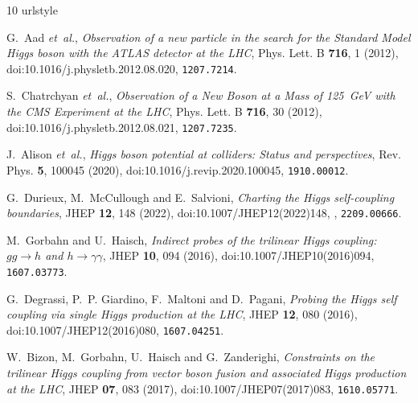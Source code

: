\documentclass{SciPost}
\begin{document}
%
%

\begin{thebibliography}{10}
\providecommand{\url}[1]{\texttt{#1}}
\providecommand{\urlprefix}{URL }
\expandafter\ifx\csname urlstyle\endcsname\relax
  \providecommand{\doi}[1]{doi:\discretionary{}{}{}#1}\else
  \providecommand{\doi}{doi:\discretionary{}{}{}\begingroup \urlstyle{rm}\Url}\fi
\providecommand{\eprint}[2][]{\url{#2}}

G.~Aad \emph{et~al.},
\newblock \emph{{Observation of a new particle in the search for the Standard Model Higgs boson with the ATLAS detector at the LHC}},
\newblock Phys. Lett. B \textbf{716}, 1 (2012),
\newblock \doi{10.1016/j.physletb.2012.08.020},
\newblock \eprint{1207.7214}.

S.~Chatrchyan \emph{et~al.},
\newblock \emph{{Observation of a New Boson at a Mass of 125~GeV with the CMS Experiment at the LHC}},
\newblock Phys. Lett. B \textbf{716}, 30 (2012),
\newblock \doi{10.1016/j.physletb.2012.08.021},
\newblock \eprint{1207.7235}.

J.~Alison \emph{et~al.},
\newblock \emph{{Higgs boson potential at colliders: Status and perspectives}},
\newblock Rev. Phys. \textbf{5}, 100045 (2020),
\newblock \doi{10.1016/j.revip.2020.100045},
\newblock \eprint{1910.00012}.

G.~Durieux, M.~McCullough and E.~Salvioni,
\newblock \emph{{Charting the Higgs self-coupling boundaries}},
\newblock JHEP \textbf{12}, 148 (2022),
\newblock \doi{10.1007/JHEP12(2022)148},
,
\newblock \eprint{2209.00666}.

M.~Gorbahn and U.~Haisch,
\newblock \emph{{Indirect probes of the trilinear Higgs coupling: $gg \to h$ and $h \to \gamma \gamma$}},
\newblock JHEP \textbf{10}, 094 (2016),
\newblock \doi{10.1007/JHEP10(2016)094},
\newblock \eprint{1607.03773}.

G.~Degrassi, P.~P. Giardino, F.~Maltoni and D.~Pagani,
\newblock \emph{{Probing the Higgs self coupling via single Higgs production at the LHC}},
\newblock JHEP \textbf{12}, 080 (2016),
\newblock \doi{10.1007/JHEP12(2016)080},
\newblock \eprint{1607.04251}.

W.~Bizon, M.~Gorbahn, U.~Haisch and G.~Zanderighi,
\newblock \emph{{Constraints on the trilinear Higgs coupling from vector boson fusion and associated Higgs production at the LHC}},
\newblock JHEP \textbf{07}, 083 (2017),
\newblock \doi{10.1007/JHEP07(2017)083},
\newblock \eprint{1610.05771}.


\end{thebibliography}
\end{document}
